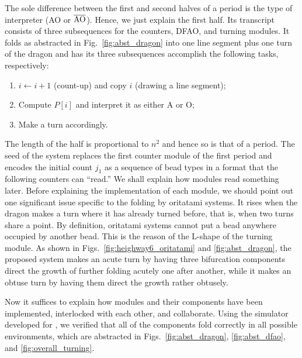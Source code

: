 The sole difference between the first and second halves of a period is the type of interpreter (AO or $\overline{\rm AO}$). 
Hence, we just explain the first half. 
Its transcript consists of three subsequences for the counters, DFAO, and turning modules. 
It folds as abstracted in Fig.~\ref{fig:abst_dragon} into one line segment plus one turn of the dragon and has its three subsequences accomplish the following tasks, respectively: 
\begin{enumerate}[itemsep=0pt]
\item $i \gets i + 1$ (count-up) and copy $i$ (drawing a line segment);
\item Compute $P[i]$ and interpret it as either A or O;
\item Make a turn accordingly.
\end{enumerate}
The length of the half is proportional to $n^2$ and hence so is that of a period. 
The seed of the system replaces the first counter module of the first period and encodes the initial count $j_1$ as a sequence of bead types in a format that the following counters can ``read.'' 
We shall explain how modules read something later. 
Before explaining the implementation of each module, we should point out one significant issue specific to the folding by oritatami systems. 
It rises when the dragon makes a turn where it has already turned before, that is, when two turns share a point. 
By definition, oritatami systems cannot put a bead anywhere occupied by another bead. 
This is the reason of the L-shape of the turning module. 
As shown in Figs.~\ref{fig:heighway6_oritatami} and \ref{fig:abst_dragon}, the proposed system makes an acute turn by having three bifurcation components direct the growth of further folding acutely one after another, while it makes an obtuse turn by having them direct the growth rather obtusely. 


Now it suffices to explain how modules and their components have been implemented, interlocked with each other, and collaborate. 
Using the simulator developed for \cite{HaKiOtSe2016}, we verified that all of the components fold correctly in all possible environments, which are abstracted in Figs.~\ref{fig:abst_dragon}, \ref{fig:abst_dfao}, and \ref{fig:overall_turning}. 

